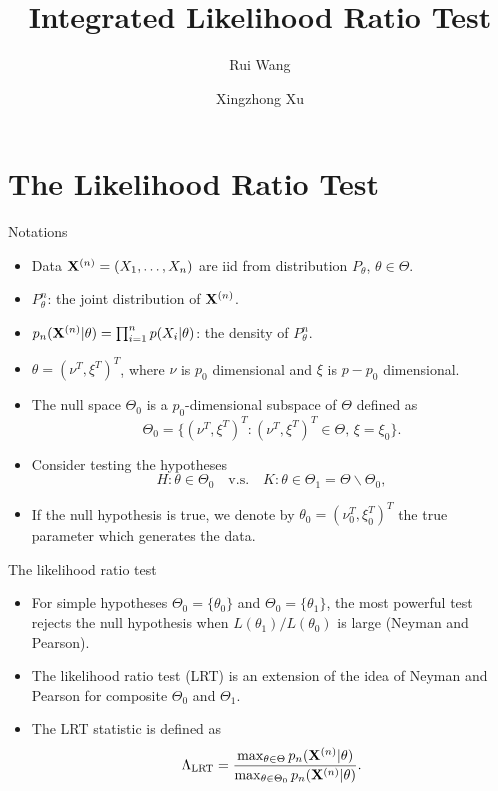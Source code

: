 \documentclass{beamer}
\title{Integrated Likelihood Ratio Test}
\date{\mydateformat{\displaydate{date}}}
\author{Rui Wang \and Xingzhong Xu}
\institute[BIT]{%
    School of Mathematics and Statistics\\ Beijing Institute of Technology\\
}
\theoremstyle{plain}
\theoremstyle{definition}
\theoremstyle{remark}
\begin{document}
\maketitle
\section{The Likelihood Ratio Test}

\begin{frame}{Notations}
    \begin{itemize}
        \item
            Data $\mathbf{X}^{(n)}=(X_1,\ldots,X_n)$ are iid from distribution $P_{\theta}$, $\theta\in\Theta$.
        \item 
    $P_{\theta}^{n}$: the joint distribution of $\mathbf{X}^{(n)}$.
        \item
    $p_{n}(\mathbf{X}^{(n)}|\theta)=\prod_{i=1}^n p(X_i|\theta)$: the density of $P_{\theta}^n$.
\item
$\theta=(\nu^T,\xi^T)^T$, where $\nu$ is $p_0$ dimensional and $\xi$ is $p-p_0$ dimensional.
\item
The null space $\Theta_0$ is a $p_0$-dimensional subspace of $\Theta$ defined as
\begin{equation*}
    \Theta_0=\{(\nu^T,\xi^T)^T:(\nu^T,\xi^T)^T\in\Theta, \, \xi=\xi_0\}.
\end{equation*}
\item
 Consider testing the hypotheses
\begin{equation*}
    H:\theta\in\Theta_0\quad \text{v.s.}\quad K:\theta\in \Theta_1=\Theta\backslash \Theta_0,
\end{equation*}
\item
If the null hypothesis is true, we denote by $\theta_0=(\nu_0^T,\xi_0^T)^T$ the true parameter which generates the data.
    \end{itemize}
\end{frame}
\begin{frame}{The likelihood ratio test}

    \begin{itemize}
        \item 
    For simple hypotheses $\Theta_0=\{\theta_0\}$ and $\Theta_0=\{\theta_1\}$, the most powerful test rejects the null hypothesis when $L(\theta_1)/L(\theta_0)$ is large
    (Neyman and Pearson).
\item
    The likelihood ratio test (LRT) is an extension of the idea of Neyman and Pearson for composite $\Theta_0$ and $\Theta_1$. 
\item
    The LRT statistic is defined as
    \begin{equation*}
        \Lambda_{\text{LRT}}=\frac{\max_{\theta \in \Theta}p_n(\mathbf{X}^{(n)}|\theta)}{\max_{\theta \in \Theta_0}p_n(\mathbf{X}^{(n)}|\theta)}.
    \end{equation*}
    \end{itemize}




\end{frame}
\end{document}
